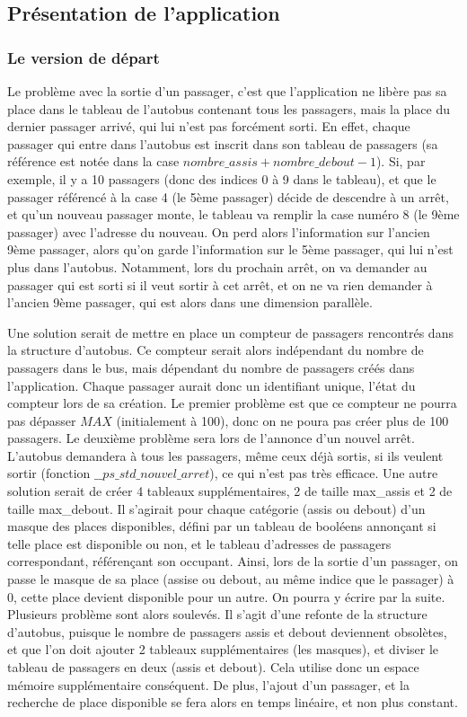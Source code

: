\documentclass[a4paper,11pts]{article}
\begin{document}
\subsection{Présentation de l'application}
\subsubsection{Le version de départ}
Le problème avec la sortie d'un passager, c'est que l'application ne libère pas sa place dans le tableau de l'autobus contenant tous les passagers, mais la place du dernier passager arrivé, qui lui n'est pas forcément sorti. En effet, chaque passager qui entre dans l'autobus est inscrit dans son tableau de passagers (sa référence est notée dans la case $nombre\_assis+nombre\_debout-1$). Si, par exemple, il y a 10 passagers (donc des indices 0 à 9 dans le tableau), et que le passager référencé à la case 4 (le 5ème passager) décide de descendre à un arrêt, et qu'un nouveau passager monte, le tableau va remplir la case numéro 8 (le 9ème passager) avec l'adresse du nouveau. On perd alors l'information sur l'ancien 9ème passager, alors qu'on garde l'information sur le 5ème passager, qui lui n'est plus dans l'autobus. Notamment, lors du prochain arrêt, on va demander au passager qui est sorti si il veut sortir à cet arrêt, et on ne va rien demander à l'ancien 9ème passager, qui est alors dans une dimension parallèle.

Une solution serait de mettre en place un compteur de passagers rencontrés dans la structure d'autobus. Ce compteur serait alors indépendant du nombre de passagers dans le bus, mais dépendant du nombre de passagers créés dans l'application. Chaque passager aurait donc un identifiant unique, l'état du compteur lors de sa création. Le premier problème est que ce compteur ne pourra pas dépasser $MAX$ (initialement à 100), donc on ne poura pas créer plus de 100 passagers. Le deuxième problème sera lors de l'annonce d'un nouvel arrêt. L'autobus demandera à tous les passagers, même ceux déjà sortis, si ils veulent sortir (fonction $\_\_ps\_std\_nouvel\_arret$), ce qui n'est pas très efficace.
Une autre solution serait de créer 4 tableaux supplémentaires, 2 de taille max\_assis et 2 de taille max\_debout. Il s'agirait pour chaque catégorie (assis ou debout) d'un masque des places disponibles, défini par un tableau de booléens annonçant si telle place est disponible ou non, et le tableau d'adresses de passagers correspondant, référençant son occupant. Ainsi, lors de la sortie d'un passager, on passe le masque de sa place (assise ou debout, au même indice que le passager) à 0, cette place devient disponible pour un autre. On pourra y écrire par la suite. Plusieurs problème sont alors soulevés. Il s'agit d'une refonte de la structure d'autobus, puisque le nombre de passagers assis et debout deviennent obsolètes, et que l'on doit ajouter 2 tableaux supplémentaires (les masques), et diviser le tableau de passagers en deux (assis et debout). Cela utilise donc un espace mémoire supplémentaire conséquent. De plus, l'ajout d'un passager, et la recherche de place disponible se fera alors en temps linéaire, et non plus constant.
\end{document}
